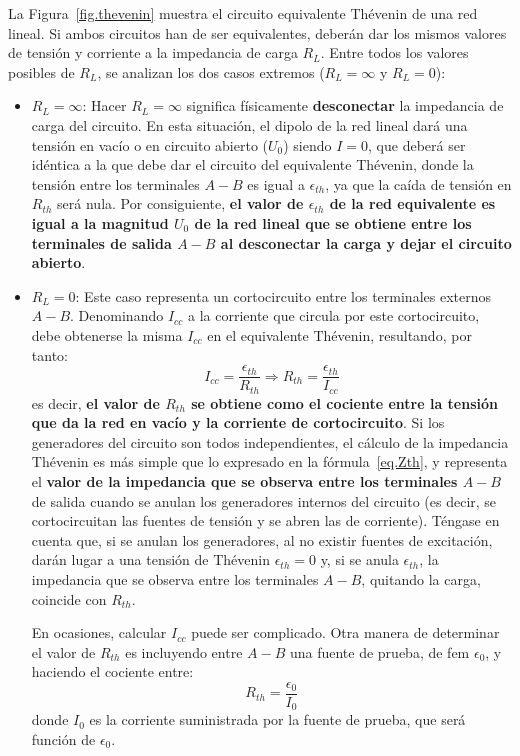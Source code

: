 \documentclass[11pt]{book} %
\begin{document}
     La Figura~\ref{fig.thevenin} muestra el circuito equivalente Thévenin de una red lineal. Si ambos circuitos han de ser equivalentes, deberán dar los mismos valores de tensión y corriente a la impedancia de carga $R_L$. Entre todos los valores posibles de $R_L$, se analizan los dos casos extremos ($R_L=\infty$ y $R_L=0$):
     \begin{itemize}
         \item $R_L=\infty$: Hacer $R_L=\infty$ significa físicamente \textbf{desconectar} la impedancia de carga del circuito. En esta situación, el dipolo de la red lineal dará una tensión en vacío o en circuito abierto ($U_0$) siendo $I=0$, que deberá ser idéntica a la que debe dar el circuito del equivalente Thévenin, donde la tensión entre los terminales $A-B$ es igual a $\epsilon_{th}$, ya que la caída de tensión en $R_{th}$ será nula. Por consiguiente, \textbf{el valor de $\epsilon_{th}$ de la red equivalente es igual a la magnitud $U_0$ de la red lineal que se obtiene entre los terminales de salida $A-B$ al desconectar la carga y dejar el circuito abierto}.
         \item $R_L=0$: Este caso representa un cortocircuito entre los terminales externos $A-B$. Denominando $I_{cc}$ a la corriente que circula por este cortocircuito, debe obtenerse la misma $I_{cc}$ en el equivalente Thévenin, resultando, por tanto:
         \begin{equation}\label{eq.Zth} I_{cc}=\dfrac{\epsilon_{th}}{R_{th}}\Rightarrow \boxed{R_{th}=\dfrac{\epsilon_{th}}{I_{cc}}}
         \end{equation}
         es decir, \textbf{el valor de $R_{th}$ se obtiene como el cociente entre la tensión que da la red en vacío y la corriente de cortocircuito}. Si los generadores del circuito son todos independientes, el cálculo de la impedancia Thévenin es más simple que lo expresado en la fórmula~\eqref{eq.Zth}, y representa el \textbf{valor de la impedancia que se observa entre los terminales $A-B$} de salida cuando se anulan los generadores internos del circuito (es decir, se cortocircuitan las fuentes de tensión y se abren las de corriente). Téngase en cuenta que, si se anulan los generadores, al no existir fuentes de excitación, darán lugar a una tensión de Thévenin $\epsilon_{th}=0$ y, si se anula $\epsilon_{th}$, la impedancia que se observa entre los terminales $A-B$, quitando la carga, coincide con $R_{th}$. 
         \begin{remark}
             En ocasiones, calcular $I_{cc}$ puede ser complicado. Otra manera de determinar el valor de $R_{th}$  es incluyendo entre $A-B$ una fuente de prueba, de fem $\epsilon_0$, y haciendo el cociente entre:
             \begin{equation*}
                 R_{th}=\dfrac{\epsilon_0}{I_{0}}
             \end{equation*}
             donde $I_{0}$ es la corriente suministrada por la fuente de prueba, que será función de $\epsilon_0$.
         \end{remark}
     \end{itemize}
     
\end{document}
